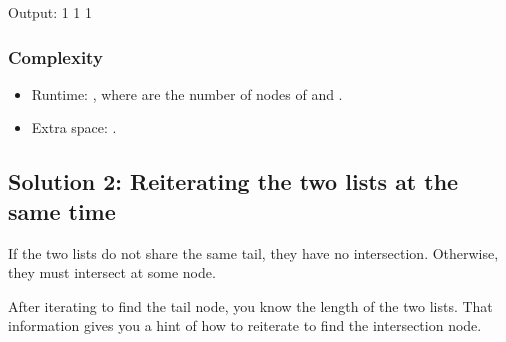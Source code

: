 \documentclass[letterpaper,12pt,english]{book}
\begin{document}
\begin{sphinxVerbatim}[commandchars=\\\{\}]
Output:
1
1
1
\end{sphinxVerbatim}


\subsubsection{Complexity}
\label{\detokenize{Linked_List/02_LL_160_Intersection_of_Two_Linked_Lists:complexity}}\begin{itemize}
\item {} 
\sphinxAtStartPar
Runtime: , where  are the number of nodes of  and .

\item {} 
\sphinxAtStartPar
Extra space: .

\end{itemize}


\subsection{Solution 2: Reiterating the two lists at the same time}
\label{\detokenize{Linked_List/02_LL_160_Intersection_of_Two_Linked_Lists:solution-2-reiterating-the-two-lists-at-the-same-time}}
\sphinxAtStartPar
If the two lists do not share the same tail, they have no intersection. Otherwise, they must intersect at some node.

\sphinxAtStartPar
After iterating to find the tail node, you know the length of the two lists. That information gives you a hint of how to reiterate to find the intersection node.
\end{document}
